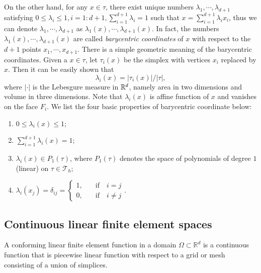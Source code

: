 On the other hand, for any $ x\in \tau$, there exist unique numbers $\lambda _1,\cdots, \lambda _{d+1}$ satisfying $\displaystyle 0\leq \lambda_i\leq 1, i=1:d+1, \sum _{i=1}^{d+1}\lambda _i=1$ such that $\displaystyle x=\sum _{i=1}^{d+1}\lambda _i x_i$, thus we can denote $\lambda _1,\cdots, \lambda _{d+1}$ as $\lambda _1( x),\cdots, \lambda _{d+1}( x)$. In fact,  the numbers $\lambda _1( x),\cdots, \lambda _{d+1}( x)$ are
called {\em barycentric coordinates} of $ x$ with respect to the
$d+1$ points $ x_1, \cdots,  x_{d+1}$. There is a simple
geometric meaning of the barycentric coordinates. Given a $ x\in
\tau$, let $\tau _i( x)$ be the simplex with vertices $ x_i$
replaced by $ x$. Then it can be easily shown that
\begin{equation}\label{eq:lambdasolution}
\lambda _i( x) = |\tau _i( x)|/|\tau|,
\end{equation}
where $|\cdot|$ is the Lebesgure measure in $\mathbb R^d$, namely area in
two dimensions and volume in three dimensions. Note that $\lambda
_i( x)$ is affine function of $ x$ and vanishes on the face
$F_i$. We list the four basic properties of barycentric coordinate below:
\begin{enumerate}
\item $0\leq \lambda_i( x)\leq 1$;
\item $\displaystyle\sum_{i=1}^{d+1} \lambda_i( x)=1$;
\item $\lambda_i( x)\in P_1(\tau)$, where $P_1(\tau)$ denotes the space of polynomials of degree $1$
(linear) on $\tau\in \mathcal T_h$;
\item $\lambda_i( x_j)=\delta_{ij}=\begin{cases}
1, \quad &\text{if}  \quad  i=j\\
0, \quad &\text{if} \quad i\neq j
\end{cases}.$
\end{enumerate}

\subsection{Continuous linear finite element spaces}\label{linearFE}
A conforming linear finite element function in a domain $\Omega\subset
\mathbb R^d$ is a continuous function that is piecewise linear
function with respect to a grid or mesh consisting of a union of simplices.

